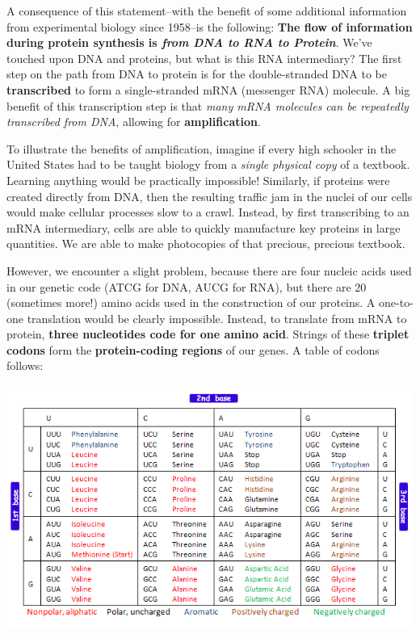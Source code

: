 \documentclass[
]{article}
\begin{document}
A consequence of this statement--with the benefit of some additional
information from experimental biology since 1958--is the following:
\textbf{The flow of information during protein synthesis is \emph{from
DNA to RNA to Protein}}. We've touched upon DNA and proteins, but what
is this RNA intermediary? The first step on the path from DNA to protein
is for the double-stranded DNA to be \textbf{transcribed} to form a
single-stranded mRNA (messenger RNA) molecule. A big benefit of this
transcription step is that \emph{many mRNA molecules can be repeatedly
transcribed from DNA}, allowing for \textbf{amplification}.

To illustrate the benefits of amplification, imagine if every high
schooler in the United States had to be taught biology from a
\emph{single physical copy} of a textbook. Learning anything would be
practically impossible! Similarly, if proteins were created directly
from DNA, then the resulting traffic jam in the nuclei of our cells
would make cellular processes slow to a crawl. Instead, by first
transcribing to an mRNA intermediary, cells are able to quickly
manufacture key proteins in large quantities. We are able to make
photocopies of that precious, precious textbook.

However, we encounter a slight problem, because there are four nucleic
acids used in our genetic code (ATCG for DNA, AUCG for RNA), but there
are 20 (sometimes more!) amino acids used in the construction of our
proteins. A one-to-one translation would be clearly impossible. Instead,
to translate from mRNA to protein, \textbf{three nucleotides code for
one amino acid}. Strings of these \textbf{triplet codons} form the
\textbf{protein-coding regions} of our genes. A table of codons follows:

\includegraphics{./Images/codontable.png}
\end{document}
